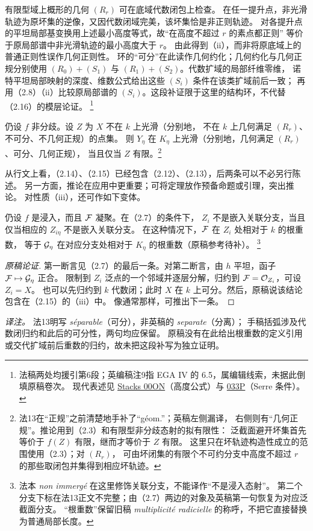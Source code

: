 有限型域上概形的几何 $(R_r)$ 可在底域代数闭包上检查。
在任一提升点，非光滑轨迹为原坏集的逆像，又因代数闭域完美，该坏集恰是非正则轨迹。
对各提升点的平坦局部基变换用上述最小高度等式，故“在高度不超过 $r$ 的素点都正则”
等价于原局部谱中非光滑轨迹的最小高度大于 $r$。
由此得到（ii），而非将原底域上的普通正则性误作几何正则性。
环的“可分”在此读作几何约化；几何约化与几何正规分别使用
$(R_0)+(S_1)$ 与 $(R_1)+(S_2)$。代数扩域的局部纤维零维，
诺特平坦局部映射的深度、维数公式给出这些 $(S_i)$ 条件在该类扩域前后一致；
再用（2.8）（ii）比较原局部谱的 $(S_i)$。这段补证限于这里的结构环，不代替（2.16）的模层论证。
\footnote{法稿两处均援引第6段；英编稿注9指 EGA IV 的 6.5，属编辑线索，未据此倒填原稿卷次。
现代表述见 \href{https://stacks.math.columbia.edu/tag/00ON}{Stacks 00ON}（高度公式）与
\href{https://stacks.math.columbia.edu/tag/033P}{033P}（Serre 条件）。}

仍设 $f$ 非分歧。设 $Z$ 为 $X$ 不在 $k$ 上光滑（分别地，
不在 $k$ 上几何满足 $(R_r)$、不可分、不几何正规）的点集。
则 $Y_\eta$ 在 $K_\eta$ 上光滑（分别地，几何满足 $(R_r)$、可分、几何正规），
当且仅当 $Z$ 有限。\footnote{法13在“正规”之前清楚地手补了“géom.”；英稿左侧漏译，
右侧则有“几何正规”。推论用到（2.3）和有限型非分歧态射的拟有限性：
泛截面避开坏集首先等价于 $f(Z)$ 有限，继而才等价于 $Z$ 有限。
这里只在坏轨迹构造性成立的范围使用（2.3）；对 $(R_r)$，
可由坏闭集的有限个不可约分支中高度不超过 $r$ 的那些取闭包并集得到相应坏轨迹。}

从行文上看，（2.14）、（2.15）已经包含（2.12）、（2.13），后两条可以不必另行陈述。
另一方面，推论在应用中更重要；可将定理放作预备命题或引理，突出推论。
对性质（iii），还可作如下变体。

仍设 $f$ 是浸入，而且 $\mathcal F$ 凝聚。在（2.7）的条件下，
$Z_i$ 不是嵌入关联分支，当且仅当相应的 $Z_{i\eta}$ 不是嵌入关联分支。
在这种情况下，$\mathcal F$ 在 $Z_i$ 处相对于 $k$ 的根重数，
等于 $\mathcal G_\eta$ 在对应分支处相对于 $K_\eta$ 的根重数（原稿参考待补）。
\footnote{法本 \emph{non immergé} 在这里修饰关联分支，不能译作“不是浸入态射”。
第二个分支下标在法13正文不完整；由（2.7）两边的对象及英稿第一句恢复为对应泛截面分支。
“根重数”保留旧稿 \emph{multiplicité radicielle} 的称呼，不把它直接替换为普通局部长度。}
\begin{proof}[原稿论证]
第一断言见（2.7）的最后一条。对第二断言，由 $h$ 平坦，函子 $\mathcal F\mapsto\mathcal G_\eta$ 正合。
限制到 $Z_i$ 泛点的一个邻域并逐层分解，归约到 $\mathcal F=\mathcal O_{Z_i}$，可设 $Z_i=X$。
也可以先归约到 $k$ 代数闭；此时 $X$ 在 $k$ 上可分。然后，原稿说该结论包含在（2.15）的（iii）中。
像通常那样，可推出下一条。
\end{proof}
\noindent\emph{译注。} 法13明写 \emph{séparable}（可分），非英稿的 \emph{separate}（分离）；
手稿括弧涉及代数闭归约和此后的可分性，两句均应保留。
原稿没有在此给出根重数的定义引用或交代扩域前后重数的归约，故未把这段补写为独立证明。

